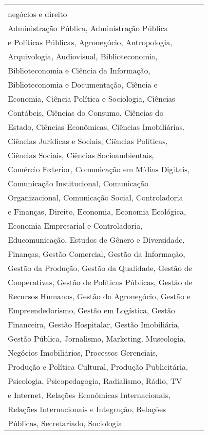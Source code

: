 \begin{longtable}[c]{ll}
    \begin{tabular}[c]{@{}l@{}}Ciências sociais, \\ negócios e direito\end{tabular} & \begin{tabular}[c]{@{}l@{}}Administração, Administração de Empresas, \\ Administração Pública, Administração Pública \\ e Políticas Públicas, Agronegócio, Antropologia, \\ Arquivologia, Audiovisual, Biblioteconomia, \\ Biblioteconomia e Ciência da Informação, \\ Biblioteconomia e Documentação, Ciência e \\ Economia, Ciência Política e Sociologia, Ciências \\ Contábeis, Ciências do Consumo, Ciências do \\ Estado, Ciências Econômicas, Ciências Imobiliárias, \\ Ciências Jurídicas e Sociais, Ciências Políticas, \\ Ciências Sociais, Ciências Socioambientais, \\ Comércio Exterior, Comunicação em Mídias Digitais, \\ Comunicação Institucional, Comunicação \\ Organizacional, Comunicação Social, Controladoria \\ e Finanças, Direito, Economia, Economia Ecológica, \\ Economia Empresarial e Controladoria, \\ Educomunicação, Estudos de Gênero e Diversidade, \\ Finanças, Gestão Comercial, Gestão da Informação, \\ Gestão da Produção, Gestão da Qualidade, Gestão de \\ Cooperativas, Gestão de Políticas Públicas, Gestão de\\ Recursos Humanos, Gestão do Agronegócio, Gestão e \\ Empreendedorismo, Gestão em Logística, Gestão \\ Financeira, Gestão Hospitalar, Gestão Imobiliária, \\ Gestão Pública, Jornalismo, Marketing, Museologia, \\ Negócios Imobiliários, Processos Gerenciais, \\ Produção e Política Cultural, Produção Publicitária, \\ Psicologia, Psicopedagogia, Radialismo, Rádio, TV \\ e Internet, Relações Econômicas Internacionais, \\ Relações Internacionais e Integração, Relações \\ Públicas, Secretariado, Sociologia\end{tabular}                                                                                                                                                                                                       \\ \hline

\end{longtable}

